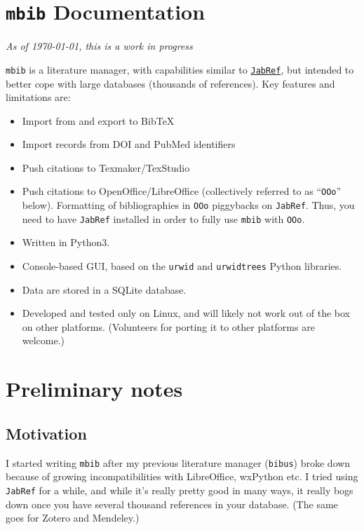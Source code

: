 \documentclass[10pt]{article}
\newcommand*{\mbib}{\texttt{mbib}\xspace}
\newcommand*{\jabref}{\texttt{JabRef}\xspace}
\newcommand*{\ooo}{\texttt{OOo}\xspace}
\begin{document}
\section*{\mbib Documentation}

\emph{As of \today, this is a work in progress}

\bigskip

\noindent \mbib is a literature manager, with capabilities similar to \href{http://www.jabref.org}{\jabref}, but intended to better cope with large databases (thousands of references).  Key features and limitations are:

\begin{itemize}
\item Import from and export to BibTeX  

\item Import records from DOI and PubMed identifiers

\item Push citations to Texmaker/TexStudio

\item Push citations to OpenOffice/LibreOffice (collectively referred to as ``\ooo'' below). Formatting of bibliographies in \ooo piggybacks on \jabref. Thus, you need to have \jabref installed in order to fully use \mbib with \ooo.

\item Written in Python3.

\item Console-based GUI, based on the \texttt{urwid} and
\texttt{urwidtrees} Python libraries. 

\item Data are stored in a SQLite database.

\item Developed and tested only on Linux, and will likely not work out of the box on other platforms. (Volunteers for porting it to other platforms are welcome.)

\end{itemize}

\section{Preliminary notes}

\subsection{Motivation}

I started writing \mbib after my previous literature manager (\texttt{bibus}) broke down because of growing incompatibilities with LibreOffice, wxPython etc. I tried using \jabref for a while, and while it's really pretty good in many ways, it really bogs down once you have several thousand references in your database. (The same goes for Zotero and Mendeley.)
\end{document}
